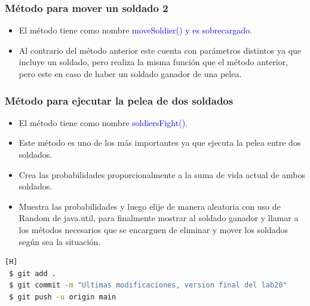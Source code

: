 \documentclass{article}
\begin{document}
\subsubsection{Método para mover un soldado 2}
\begin{itemize}
    \item El método tiene como nombre \textcolor{blue}{moveSoldier() y es sobrecargado}.
    \item Al contrario del método anterior este cuenta con parámetros distintos ya que incluye un soldado, pero realiza la misma función que el método anterior, pero este en caso de haber un soldado ganador de una pelea.
\end{itemize}



\subsubsection{Método para ejecutar la pelea de dos soldados}
\begin{itemize}
    \item El método tiene como nombre \textcolor{blue}{soldiersFight()}.
    \item Este método es uno de los más importantes ya que ejecuta la pelea entre dos soldados.
    \item Crea las probabilidades proporcionalmente a la suma de vida actual de ambos soldados.
    \item Muestra las probabilidades y luego elije de manera aleatoria con uso de Random de java.util, para finalmente mostrar al soldado ganador y llamar a los métodos necesarios que se encarguen de eliminar y mover los soldados según sea la situación.
\end{itemize}


\begin{lstlisting}[language=bash,caption={Commit \href{https://github.com/hernanchoquehuanca/fp2-23b/commit/0836847c1822bcc6dfa047a2a890ebfb3a5b8116}{0836847}: Versión final del código (lab20)}][H]
 $ git add .
 $ git commit -m "Ultimas modificaciones, version final del lab20"			
 $ git push -u origin main
\end{lstlisting}

     

\end{document}
